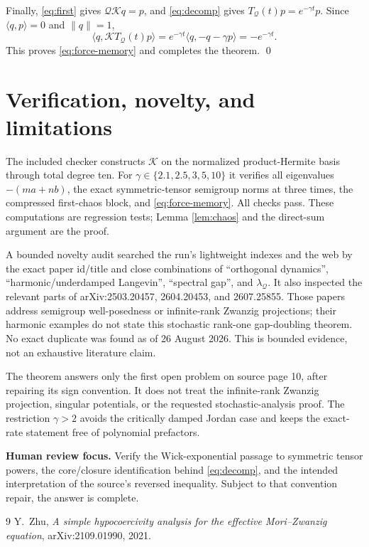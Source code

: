\documentclass[11pt]{article}
\theoremstyle{remark}
\newcommand{\K}{\mathcal K}
\newcommand{\Qj}{\mathcal Q}
\begin{document}
Finally, \eqref{eq:first} gives $\Qj\K q=p$, and \eqref{eq:decomp} gives
$T_{\Qj}(t)p=e^{-\gamma t}p$.  Since $\langle q,p\rangle=0$ and
$\|q\|=1$,
\[
 \langle q,\K T_{\Qj}(t)p\rangle
 =e^{-\gamma t}\langle q,-q-\gamma p\rangle
 =-e^{-\gamma t}.
\]
This proves \eqref{eq:force-memory} and completes the theorem.
\qed

\section{Verification, novelty, and limitations}

The included checker constructs $\K$ on the normalized product-Hermite basis
through total degree ten.  For $\gamma\in\{2.1,2.5,3,5,10\}$ it verifies all
eigenvalues $-(ma+nb)$, the exact symmetric-tensor semigroup norms at three
times, the compressed first-chaos block, and \eqref{eq:force-memory}.  All
checks pass.  These computations are regression tests; Lemma
\ref{lem:chaos} and the direct-sum argument are the proof.

A bounded novelty audit searched the run's lightweight indexes and the web by
the exact paper id/title and close combinations of ``orthogonal dynamics'',
``harmonic/underdamped Langevin'', ``spectral gap'', and $\lambda_{\Qj}$.
It also inspected the relevant parts of arXiv:2503.20457, 2604.20453, and
2607.25855.  Those papers address semigroup well-posedness or infinite-rank
Zwanzig projections; their harmonic examples do not state this stochastic
rank-one gap-doubling theorem.  No exact duplicate was found as of 26 August
2026.  This is bounded evidence, not an exhaustive literature claim.

The theorem answers only the first open problem on source page 10, after
repairing its sign convention.  It does not treat the infinite-rank Zwanzig
projection, singular potentials, or the requested stochastic-analysis proof.
The restriction $\gamma>2$ avoids the critically damped Jordan case and keeps
the exact-rate statement free of polynomial prefactors.

\textbf{Human review focus.} Verify the Wick-exponential passage to symmetric
tensor powers, the core/closure identification behind \eqref{eq:decomp}, and
the intended interpretation of the source's reversed inequality.  Subject to
that convention repair, the answer is complete.

\begin{thebibliography}{9}
Y.~Zhu,
\emph{A simple hypocoercivity analysis for the effective Mori--Zwanzig equation},
arXiv:2109.01990, 2021.
\end{thebibliography}
\end{document}
